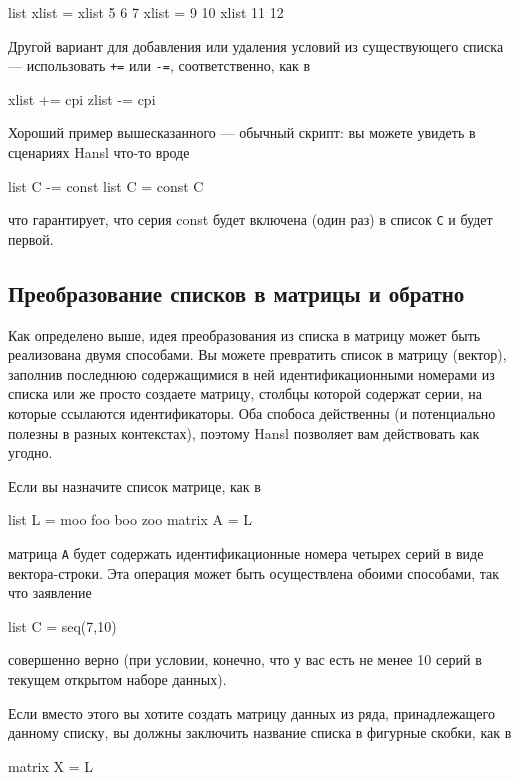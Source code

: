 \begin{code}
list xlist = xlist 5 6 7
xlist = 9 10 xlist 11 12
\end{code}
Другой вариант для добавления или удаления условий из существующего
списка --- использовать \texttt{+=} или \texttt{-=}, соответственно,
как в

\begin{code}
xlist += cpi
zlist -= cpi
\end{code}
Хороший пример вышесказанного --- обычный скрипт: вы можете увидеть в
сценариях Hansl что-то вроде
\begin{code}
  list C -= const
  list C = const C
\end{code}
что гарантирует, что серия const будет включена (один раз) в список
\texttt{C} и будет первой.

\subsection{Преобразование списков в матрицы и обратно}

Как определено выше, идея преобразования из списка в матрицу может
быть реализована двумя способами. Вы можете превратить список в
матрицу (вектор), заполнив последнюю содержащимися в ней
идентификационными номерами из списка или же просто создаете матрицу,
столбцы которой содержат серии, на которые ссылаются
идентификаторы. Оба спобоса действенны (и потенциально полезны в
разных контекстах), поэтому Hansl позволяет вам действовать как
угодно.

Если вы назначите список матрице, как в

\begin{code}
  list L = moo foo boo zoo
  matrix A = L
\end{code}
матрица \texttt{A} будет содержать идентификационные номера четырех
серий в виде вектора-строки. Эта операция может быть осуществлена
обоими способами, так что заявление
\begin{code}
  list C = seq(7,10)
\end{code}
совершенно верно (при условии, конечно, что у вас есть не менее 10
серий в текущем открытом наборе данных).

Если вместо этого вы хотите создать матрицу данных из ряда,
принадлежащего данному списку, вы должны заключить название списка в
фигурные скобки, как в

\begin{code}
  matrix X = {L}
\end{code}

